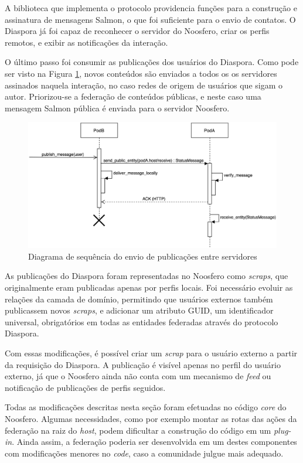 A biblioteca que implementa o protocolo providencia funções para a construção e
assinatura de mensagens Salmon, o que foi suficiente para o envio de contatos. O
Diaspora já foi capaz de reconhecer o servidor do Noosfero, criar os perfis remotos,
e exibir as notificações da interação.


O último passo foi consumir as publicações dos usuários do Diaspora. Como pode ser
visto na Figura \ref{fig:seq_publicacao}, novos conteúdos são enviados a todos os
os servidores assinados naquela interação, no caso redes de origem de usuários que
sigam o autor. Priorizou-se a federação de conteúdos públicas, e neste caso uma
mensagem Salmon pública é enviada para o servidor Noosfero.

\begin{figure}[h]
	\centering
		\includegraphics[keepaspectratio=true,scale=0.6]{figuras/seq_publicacao.eps}
	\caption{Diagrama de sequência do envio de publicações entre servidores}
	\label{fig:seq_publicacao}
\end{figure}

As publicações do Diaspora foram representadas no Noosfero como \textit{scraps}, que
originalmente eram publicadas apenas por perfis locais. Foi necessário evoluir as
relações da camada de domínio, permitindo que usuários externos também publicassem
novos \textit{scraps}, e adicionar um atributo GUID, um identificador universal,
obrigatórios em todas as entidades federadas através do protocolo Diaspora.

Com essas modificações, é possível criar um \textit{scrap} para o usuário externo a
partir da requisição do Diaspora. A publicação é visível apenas no perfil do usuário
externo, já que o Noosfero ainda não conta com um mecanismo de \textit{feed} ou
notificação de publicações de perfis seguidos.

Todas as modificações descritas nesta seção foram efetuadas no código \textit{core}
do Noosfero. Algumas necessidades, como por exemplo montar as rotas das ações da
federação na raiz do \textit{host}, podem dificultar a construção do código em um
\textit{plug-in}. Ainda assim, a federação poderia ser desenvolvida em um destes
componentes com modificações menores no \textit{code}, caso a comunidade julgue mais
adequado.

